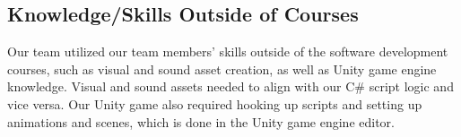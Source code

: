 \documentclass{article}
\begin{document}
\subsection{Knowledge/Skills Outside of Courses}

Our team utilized our team members' skills outside of the software development 
courses, such as visual and sound asset creation, as well as Unity game engine 
knowledge. Visual and sound assets needed to align with our C\# script logic 
and vice versa. Our Unity game also required hooking up scripts and setting 
up animations and scenes, which is done in the Unity game engine editor.



\end{document}
